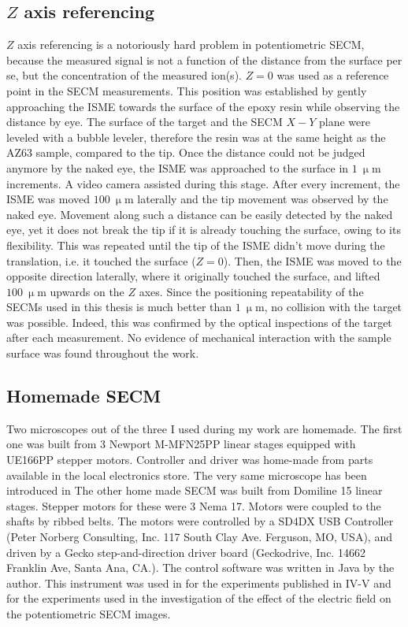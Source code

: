 \subsection{$Z$ axis referencing}
$Z$ axis referencing is a notoriously hard problem in potentiometric SECM, because the measured signal is not a function of the distance from the surface per se, but the concentration of the measured ion(s). $Z=0$ was used as a reference point in the SECM measurements. This position was established by gently approaching the ISME towards the surface of the epoxy resin while observing the distance by eye. The surface of the target and the SECM $X-Y$ plane were leveled with a bubble leveler, therefore the resin was at the same height as the AZ63 sample, compared to the tip. Once the distance could not be judged anymore by the naked eye, the ISME was approached to the surface in $1~\upmu$m increments. A video camera assisted during this stage. After every increment, the ISME was moved $100~\upmu$m laterally and the tip movement was observed by the naked eye. Movement along such a distance can be easily detected by the naked eye, yet it does not break the tip if it is already touching the surface, owing to its flexibility. This was repeated until the tip of the ISME didn’t move during the translation, i.e. it touched the surface ($Z=0$). Then, the ISME was moved to the opposite direction laterally, where it originally touched the surface, and lifted $100~\upmu$m upwards on the $Z$ axes. Since the positioning repeatability of the SECMs used in this thesis is much better than $1~\upmu$m, no collision with the target was possible. Indeed, this was confirmed by the optical inspections of the target after each measurement. No evidence of mechanical interaction with the sample surface was found throughout the work.

		\subsection{Homemade SECM}
Two microscopes out of the three I used during my work are homemade.
The first one was built from 3 Newport M-MFN25PP linear stages equipped with UE166PP stepper motors. 
Controller and driver was home-made from parts available in the local electronics store.
The very same microscope has been introduced in \cite{kovacs1999automatic}
The other home made SECM was built from Domiline 15 linear stages.
Stepper motors for these were 3 Nema 17.
Motors were coupled to the shafts by ribbed belts.
The motors were controlled by a SD4DX USB Controller (Peter Norberg Consulting, Inc. 117 South Clay Ave. Ferguson, MO, USA), and driven by a Gecko step-and-direction driver board (Geckodrive, Inc. 14662 Franklin Ave, Santa Ana, CA.).
The control software was written in Java by the author. 
This instrument was used in for the experiments published in IV-V and for the experiments used in the investigation of the effect of the electric field on the potentiometric SECM images.
